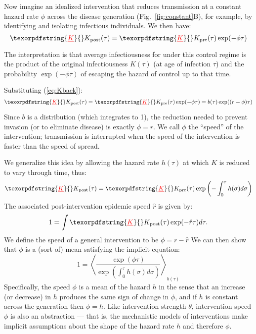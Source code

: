 \documentclass[12pt]{article}
\newcommand{\KK}{\ensuremath{{K}}} %
\newcommand{\Kx}[1]{\ensuremath{\KK_{\mathrm{#1}}}} %
\newcommand{\Kpre}{\Kx{pre}} %
\newcommand{\Kpost}{\Kx{post}} %
\newcommand{\figref}[1]{Fig.~\ref{fig:#1}}
\newcommand{\eqref}[1]{(\ref{eq:#1})}
\newcommand{\eqlab}[1]{\label{eq:#1}}
\providecommand{\DIFaddtex}[1]{{\protect\color{blue}\uwave{#1}}} %
\providecommand{\DIFdeltex}[1]{{\protect\color{red}\sout{#1}}}                      %
\providecommand{\DIFaddbegin}{} %
\providecommand{\DIFaddend}{} %
\providecommand{\DIFdelbegin}{} %
\providecommand{\DIFdelend}{} %
\providecommand{\DIFadd}[1]{\texorpdfstring{\DIFaddtex{#1}}{#1}} %
\providecommand{\DIFdel}[1]{\texorpdfstring{\DIFdeltex{#1}}{}} %
\newcommand{\DIFscaledelfig}{0.5}
\newlength{\DIFdelgraphicswidth} %
\newlength{\DIFdelgraphicsheight} %
\newcommand{\DIFaddincludegraphics}[2][]{{\color{blue}\fbox{\DIFOincludegraphics[#1]{#2}}}} %
\newcommand{\DIFdelincludegraphics}[2][]{%
\sbox{\DIFdelgraphicsbox}{\DIFOincludegraphics[#1]{#2}}%
\settoboxwidth{\DIFdelgraphicswidth}{\DIFdelgraphicsbox} %
\settoboxtotalheight{\DIFdelgraphicsheight}{\DIFdelgraphicsbox} %
\scalebox{\DIFscaledelfig}{%
\parbox[b]{\DIFdelgraphicswidth}{\usebox{\DIFdelgraphicsbox}\\[-\baselineskip] \rule{\DIFdelgraphicswidth}{0em}}\llap{\resizebox{\DIFdelgraphicswidth}{\DIFdelgraphicsheight}{%
\setlength{\unitlength}{\DIFdelgraphicswidth}%
\begin{picture}(1,1)%
\thicklines\linethickness{2pt} %
{\color[rgb]{1,0,0}\put(0,0){\framebox(1,1){}}}%
{\color[rgb]{1,0,0}\put(0,0){\line( 1,1){1}}}%
{\color[rgb]{1,0,0}\put(0,1){\line(1,-1){1}}}%
\end{picture}%
}\hspace*{3pt}}} %
} %
\DeclareRobustCommand{\DIFaddbegin}{\DIFOaddbegin \let\includegraphics\DIFaddincludegraphics} %
\DeclareRobustCommand{\DIFaddend}{\DIFOaddend \let\includegraphics\DIFOincludegraphics} %
\DeclareRobustCommand{\DIFdelbegin}{\DIFOdelbegin \let\includegraphics\DIFdelincludegraphics} %
\DeclareRobustCommand{\DIFdelend}{\DIFOaddend \let\includegraphics\DIFOincludegraphics} %
\begin{document}
Now imagine an idealized intervention that reduces transmission at a constant hazard rate $\phi$ across the disease generation (\figref{constant}B), for example, by identifying and isolating infectious individuals.
We then have:
\begin{equation}
	\DIFdelbegin %
\DIFdel{K}\DIFdelend \DIFaddbegin \Kpost\DIFaddend (\tau) = \DIFdelbegin \DIFdel{K}\DIFdelend \DIFaddbegin \Kpre\DIFaddend (\tau)\exp(-\phi\tau)
\end{equation}
The interpretation is that average infectiousness for under this control regime is the product of the original infectiousness \DIFdelbegin \DIFdel{$K(\tau)$ }\DIFdelend \DIFaddbegin \DIFadd{$\Kpre(\tau)$ }\DIFaddend (at age of infection $\tau$) and the probability $\exp(-\phi\tau)$ of escaping the hazard of control up to that time.

Substituting \eqref{Kback}:
\begin{equation}
	\DIFdelbegin %
\DIFdel{K}\DIFdelend \DIFaddbegin \Kpost\DIFaddend (\tau) = \DIFdelbegin \DIFdel{K}\DIFdelend \DIFaddbegin \Kpre\DIFaddend (\tau)\exp(-\phi\tau) = b(\tau)\exp((r-\phi)\tau)
\end{equation}
Since $b$ is a distribution (which integrates to 1), the reduction needed to prevent invasion (or to eliminate disease) is exactly $\phi=r$. 
We call $\phi$ the ``speed'' of the intervention; transmission is interrupted when the speed of the intervention is faster than the speed of spread.

We generalize this idea by allowing the hazard rate $h(\tau)$ at which $K$ is reduced to vary through time, thus:
\begin{equation}
	\DIFdelbegin %
\DIFdel{K}\DIFdelend \DIFaddbegin \Kpost\DIFaddend (\tau) = \DIFdelbegin \DIFdel{K}\DIFdelend \DIFaddbegin \Kpre\DIFaddend (\tau) \exp\left(-\int_0^\tau h(\sigma) d\sigma\right)
\end{equation}
The associated post-intervention epidemic speed $\hat r$ is given by:
\begin{equation}
	1 = \int \DIFdelbegin %
\DIFdel{K}\DIFdelend \DIFaddbegin \Kpost\DIFaddend (\tau) \exp(-\hat r\tau) d\tau.	
\end{equation}
We define the speed of a general intervention to be $\phi = r - \hat r$
We can then show that $\phi$ is a (sort of) mean satisfying the implicit equation:
\begin{equation}
	1 = \left\langle \frac{\exp(\phi \tau) }{\exp\left(\int_0^\tau h(\sigma) d\sigma\right)} \right\rangle_{b(\tau)}
	\eqlab{speedMean}
\end{equation}
Specifically, the speed $\phi$ is a mean of the hazard $h$ in the sense that an increase (or decrease) in $h$ produces the same sign of change in $\phi$, and if $h$ is constant across the generation then $\phi=h$.
Like intervention strength $\theta$, intervention speed $\phi$ is also an abstraction --- that is, the mechanistic models of interventions make implicit assumptions about the shape of the hazard rate $h$ and therefore $\phi$.
\end{document}
